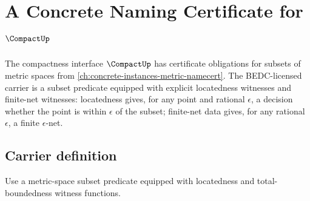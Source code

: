 \chapter{A Concrete Naming Certificate for \(\CompactUp\)}
\label{ch:concrete-instances-compact-namecert}

The compactness interface \(\CompactUp\) has certificate obligations for subsets of metric spaces from \autoref{ch:concrete-instances-metric-namecert}. The BEDC-licensed carrier is a subset predicate equipped with explicit locatedness witnesses and finite-net witnesses: locatedness gives, for any point and rational \(\epsilon\), a decision whether the point is within \(\epsilon\) of the subset; finite-net data gives, for any rational \(\epsilon\), a finite \(\epsilon\)-net.

\section{Carrier definition}

\begin{definition}
\label{def:compact-carrier}
Use a metric-space subset predicate equipped with locatedness and total-boundedness witness functions.
\end{definition}

